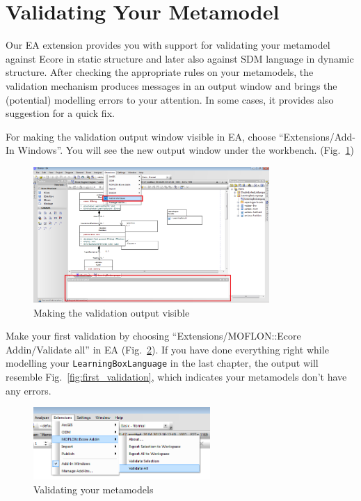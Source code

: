 \section{Validating Your Metamodel}
\label{sect:instance}

Our EA extension provides you with support for validating your metamodel against Ecore in static structure and later also against SDM language in dynamic structure. 
After checking the appropriate rules on your metamodels, the validation mechanism produces messages in an output window and brings the (potential) modelling errors to your attention. 
In some cases, it provides also suggestion for a quick fix.

For making the validation output window visible in EA, choose ``Extensions/\-Add-In Windows''. 
You will see the new output window under the workbench. (Fig.~\ref{fig:validation_output})

\begin{figure}[htbp]
	\centering 
  \includegraphics[width=0.8\textwidth]{pics/memBoxBilder/memBox40} 
	\caption{Making the validation output visible}
	\label{fig:validation_output}
\end{figure}

Make your first validation by choosing ``Extensions/\-MOFLON::Ecore Addin/\-Validate all'' in EA (Fig.~\ref{fig:validation_menu}). 
If you have done everything right while modelling your \texttt{LearningBoxLanguage} in the last chapter, the output will resemble Fig.~\ref{fig:first_validation}, which indicates your metamodels don't have any errors.

\begin{figure}[htbp]
	\centering 
  \includegraphics[width=0.6\textwidth]{pics/memBoxBilder/memBox41} 
	\caption{Validating your metamodels}
	\label{fig:validation_menu}
\end{figure}

